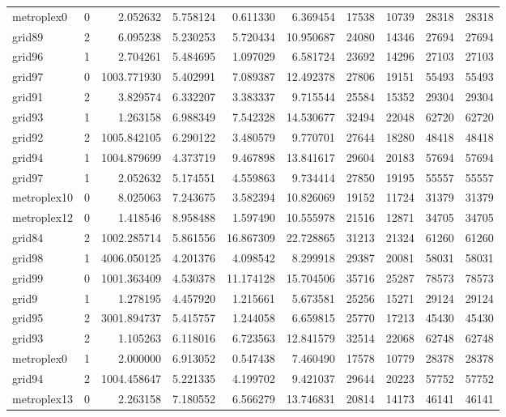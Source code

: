 \begin{longtable}{|l|r|r|r|r|r|r|r|r|r|}
metroplex0 & 0 & 2.052632 & 5.758124 & 0.611330 & 6.369454 & 17538 & 10739 & 28318 & 28318 \\
grid89 & 2 & 6.095238 & 5.230253 & 5.720434 & 10.950687 & 24080 & 14346 & 27694 & 27694 \\
grid96 & 1 & 2.704261 & 5.484695 & 1.097029 & 6.581724 & 23692 & 14296 & 27103 & 27103 \\
grid97 & 0 & 1003.771930 & 5.402991 & 7.089387 & 12.492378 & 27806 & 19151 & 55493 & 55493 \\
grid91 & 2 & 3.829574 & 6.332207 & 3.383337 & 9.715544 & 25584 & 15352 & 29304 & 29304 \\
grid93 & 1 & 1.263158 & 6.988349 & 7.542328 & 14.530677 & 32494 & 22048 & 62720 & 62720 \\
grid92 & 2 & 1005.842105 & 6.290122 & 3.480579 & 9.770701 & 27644 & 18280 & 48418 & 48418 \\
grid94 & 1 & 1004.879699 & 4.373719 & 9.467898 & 13.841617 & 29604 & 20183 & 57694 & 57694 \\
grid97 & 1 & 2.052632 & 5.174551 & 4.559863 & 9.734414 & 27850 & 19195 & 55557 & 55557 \\
metroplex10 & 0 & 8.025063 & 7.243675 & 3.582394 & 10.826069 & 19152 & 11724 & 31379 & 31379 \\
metroplex12 & 0 & 1.418546 & 8.958488 & 1.597490 & 10.555978 & 21516 & 12871 & 34705 & 34705 \\
grid84 & 2 & 1002.285714 & 5.861556 & 16.867309 & 22.728865 & 31213 & 21324 & 61260 & 61260 \\
grid98 & 1 & 4006.050125 & 4.201376 & 4.098542 & 8.299918 & 29387 & 20081 & 58031 & 58031 \\
grid99 & 0 & 1001.363409 & 4.530378 & 11.174128 & 15.704506 & 35716 & 25287 & 78573 & 78573 \\
grid9 & 1 & 1.278195 & 4.457920 & 1.215661 & 5.673581 & 25256 & 15271 & 29124 & 29124 \\
grid95 & 2 & 3001.894737 & 5.415757 & 1.244058 & 6.659815 & 25770 & 17213 & 45430 & 45430 \\
grid93 & 2 & 1.105263 & 6.118016 & 6.723563 & 12.841579 & 32514 & 22068 & 62748 & 62748 \\
metroplex0 & 1 & 2.000000 & 6.913052 & 0.547438 & 7.460490 & 17578 & 10779 & 28378 & 28378 \\
grid94 & 2 & 1004.458647 & 5.221335 & 4.199702 & 9.421037 & 29644 & 20223 & 57752 & 57752 \\
metroplex13 & 0 & 2.263158 & 7.180552 & 6.566279 & 13.746831 & 20814 & 14173 & 46141 & 46141 \\

\end{longtable}

